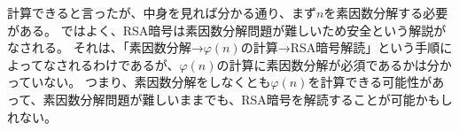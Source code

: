 
計算できると言ったが、中身を見れば分かる通り、まず$n$を素因数分解する必要がある。
ではよく、RSA暗号は素因数分解問題が難しいため安全という解説がなされる。
それは、「素因数分解→$\varphi(n)$の計算→RSA暗号解読」という手順によってなされるわけであるが、$\varphi(n)$の計算に素因数分解が必須であるかは分かっていない。
つまり、素因数分解をしなくとも$\varphi(n)$を計算できる可能性があって、素因数分解問題が難しいままでも、RSA暗号を解読することが可能かもしれない。

